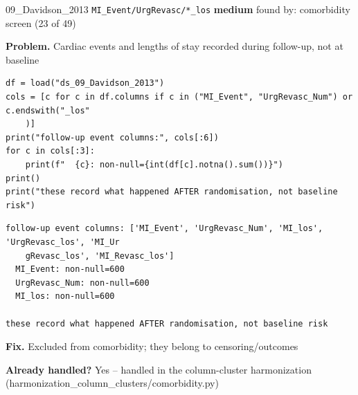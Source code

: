 \documentclass[9pt, t, handout]{beamer}
\newcommand{\ans}[1]{\textcolor{structure.fg}{#1}}
\begin{document}
\begin{frame}[fragile]{09\_Davidson\_2013 \quad \texttt{MI\_Event/UrgRevasc/*\_los}}
  {\scriptsize\textcolor{blue!55!black}{\textbf{medium}} \quad
   found by: comorbidity screen \quad (23 of 49)}
  \vspace{3pt}

  {\footnotesize \textbf{Problem.} Cardiac events and lengths of stay recorded during follow-up, not at baseline}
  \vspace{4pt}

  \begin{Verbatim}[fontsize=\tiny, frame=single, framesep=2pt, label=\tiny reproduce]
df = load("ds_09_Davidson_2013")
cols = [c for c in df.columns if c in ("MI_Event", "UrgRevasc_Num") or c.endswith("_los"
    )]
print("follow-up event columns:", cols[:6])
for c in cols[:3]:
    print(f"  {c}: non-null={int(df[c].notna().sum())}")
print()
print("these record what happened AFTER randomisation, not baseline risk")
  \end{Verbatim}
  \begin{Verbatim}[fontsize=\tiny, frame=single, framesep=2pt, label=\tiny output]
follow-up event columns: ['MI_Event', 'UrgRevasc_Num', 'MI_los', 'UrgRevasc_los', 'MI_Ur
    gRevasc_los', 'MI_Revasc_los']
  MI_Event: non-null=600
  UrgRevasc_Num: non-null=600
  MI_los: non-null=600

these record what happened AFTER randomisation, not baseline risk
  \end{Verbatim}
  \vspace{2pt}

  {\footnotesize \textbf{Fix.} Excluded from comorbidity; they belong to censoring/outcomes}
  \vspace{2pt}

  {\footnotesize \textbf{Already handled?} \ans{Yes} -- handled in the column-cluster harmonization
   (harmonization\_column\_clusters/comorbidity.py)}
\end{frame}
\end{document}
